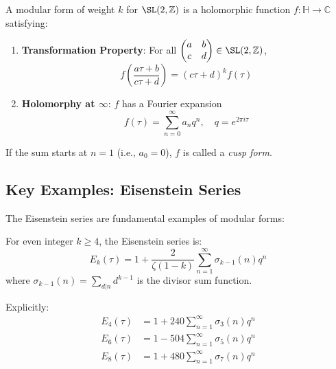\begin{definition}
A modular form of weight $k$ for $\SL(2,\mathbb{Z})$ is a holomorphic function $f: \mathbb{H} \to \mathbb{C}$ satisfying:
\begin{enumerate}
    \item \textbf{Transformation Property}: For all $\begin{pmatrix} a & b \\ c & d \end{pmatrix} \in \SL(2,\mathbb{Z})$,
    \begin{equation}
        f\left(\frac{a\tau + b}{c\tau + d}\right) = (c\tau + d)^k f(\tau)
    \end{equation}

    \item \textbf{Holomorphy at $\infty$}: $f$ has a Fourier expansion
    \begin{equation}
        f(\tau) = \sum_{n=0}^{\infty} a_n q^n, \quad q = e^{2\pi i \tau}
    \end{equation}
\end{enumerate}

If the sum starts at $n=1$ (i.e., $a_0 = 0$), $f$ is called a \textit{cusp form}.
\end{definition}

\subsection{Key Examples: Eisenstein Series}

The Eisenstein series are fundamental examples of modular forms:

\begin{definition}
For even integer $k \geq 4$, the Eisenstein series is:
\begin{equation}
    E_k(\tau) = 1 + \frac{2}{\zeta(1-k)} \sum_{n=1}^{\infty} \sigma_{k-1}(n) q^n
\end{equation}
where $\sigma_{k-1}(n) = \sum_{d|n} d^{k-1}$ is the divisor sum function.
\end{definition}

Explicitly:
\begin{align}
    E_4(\tau) &= 1 + 240 \sum_{n=1}^{\infty} \sigma_3(n) q^n \\
    E_6(\tau) &= 1 - 504 \sum_{n=1}^{\infty} \sigma_5(n) q^n \\
    E_8(\tau) &= 1 + 480 \sum_{n=1}^{\infty} \sigma_7(n) q^n
\end{align}

